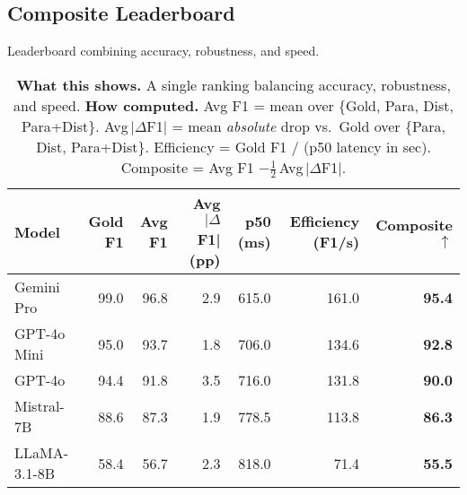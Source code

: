 \subsection{Composite Leaderboard}
\begin{table}[H]\centering
\caption{Leaderboard combining accuracy, robustness, and speed.}
\label{tab:leaderboard}
\small
\setlength{\tabcolsep}{5pt}
\renewcommand{\arraystretch}{1.08}
\begin{tabular}{lrrrrrr}
\toprule
Model & Gold F1 & Avg F1 & Avg $|\Delta$F1| (pp) & p50 (ms) & Efficiency (F1/s) & Composite $\uparrow$ \\
\midrule
Gemini Pro & 99.0 & 96.8 & 2.9 & 615.0 & 161.0 & \textbf{95.4} \\
GPT-4o Mini & 95.0 & 93.7 & 1.8 & 706.0 & 134.6 & \textbf{92.8} \\
GPT-4o & 94.4 & 91.8 & 3.5 & 716.0 & 131.8 & \textbf{90.0} \\
Mistral-7B & 88.6 & 87.3 & 1.9 & 778.5 & 113.8 & \textbf{86.3} \\
LLaMA-3.1-8B & 58.4 & 56.7 & 2.3 & 818.0 & 71.4 & \textbf{55.5} \\
\bottomrule
\end{tabular}
\caption*{\scriptsize
\textbf{What this shows.} A single ranking balancing accuracy, robustness, and speed.\;
\textbf{How computed.} Avg F1 = mean over \{Gold, Para, Dist, Para+Dist\}. 
Avg\,$|\Delta$F1| = mean \emph{absolute} drop vs.\ Gold over \{Para, Dist, Para+Dist\}. 
Efficiency = Gold F1 / (p50 latency in sec). 
Composite = Avg F1 $- \tfrac{1}{2}$\,Avg\,$|\Delta$F1|.}
\end{table}

